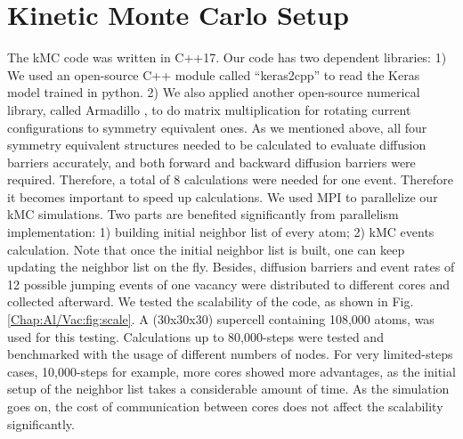 \newpage
\section{Kinetic Monte Carlo Setup}
\label{Chap:Al/Vac:section:KMC}


The \ac{kMC} code was written in C++17. \cite{Zhang2020KNN2} Our code has two dependent libraries: 1) We used an open-source C++ module called ``keras2cpp'' to read the Keras model trained in python. \cite{Perevozchikov2019} 2) We also applied another open-source numerical library, called Armadillo \cite{sanderson2016armadillo, sanderson2018user}, to do matrix multiplication for rotating current configurations to symmetry equivalent ones. As we mentioned above, all four symmetry equivalent structures needed to be calculated to evaluate diffusion barriers accurately, and both forward and backward diffusion barriers were required. Therefore, a total of 8 calculations were needed for one event. Therefore it becomes important to speed up calculations. We used \ac{MPI} to parallelize our \ac{kMC} simulations. Two parts are benefited significantly from parallelism implementation: 1) building initial neighbor list of every atom; 2) \ac{kMC} events calculation. Note that once the initial neighbor list is built, one can keep updating the neighbor list on the fly. Besides, diffusion barriers and event rates of 12 possible jumping events of one vacancy were distributed to different cores and collected afterward. We tested the scalability of the code, as shown in Fig. \ref{Chap:Al/Vac:fig:scale}. A (30x30x30) supercell containing 108,000 atoms, was used for this testing. Calculations up to 80,000-steps were tested and benchmarked with the usage of different numbers of nodes. For very limited-steps cases, 10,000-steps for example, more cores showed more advantages, as the initial setup of the neighbor list takes a considerable amount of time. As the simulation goes on, the cost of communication between cores does not affect the scalability significantly.


